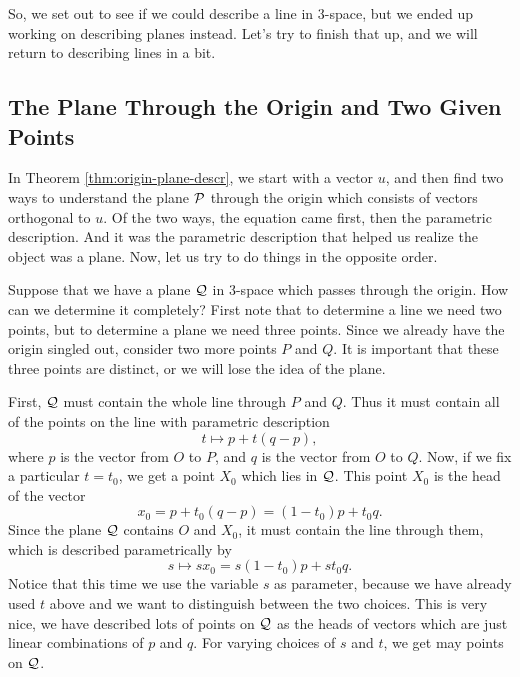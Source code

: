 \documentclass[00-livre-main.tex]{subfiles}
\begin{document}
So, we set out to see if we could describe a line in $3$-space, but we ended up working on describing planes instead. Let's try to finish that up, and we will return to describing lines in a bit.

\subsection*{The Plane Through the Origin and Two Given Points}


In Theorem \ref{thm:origin-plane-descr}, we start with a vector $u$, and then find two ways to understand the plane $\mathcal{P}$ through the origin which consists of vectors orthogonal to $u$. Of the two ways, the equation came first, then the parametric description. And it was the parametric description that helped us realize the object was a plane. 
Now, let us try to do things in the opposite order. 

Suppose that we have a plane $\mathcal{Q}$ in $3$-space which passes through the origin. How can we determine it completely? First note that to determine a line we need two points, but to determine a plane we need three points. Since we already have the origin singled out, consider two more points $P$ and $Q$. It is important that these three points are distinct, or we will lose the idea of the plane. 

First, $\mathcal{Q}$ must contain the whole line through $P$ and $Q$. Thus it must contain all of the points on the line with parametric description
\[
t \mapsto p + t(q-p),
\]
where $p$ is the vector from $O$ to $P$, and $q$ is the vector from $O$ to $Q$. Now, if we fix a particular $t=t_0$, we get a point $X_0$ which lies in $\mathcal{Q}$. This point $X_0$ is the head of the vector 
\[
x_0 = p + t_0 (q-p) = (1-t_0) p + t_0 q.
\]
Since the plane $\mathcal{Q}$ contains $O$ and $X_0$, it must contain the line through them, which is described parametrically by
\[
s \mapsto s x_0 = s(1-t_0) p + st_0 q.
\]
Notice that this time we use the variable $s$ as parameter, because we have already used $t$ above and we want to distinguish between the two choices. This is very nice, we have described lots of points on $\mathcal{Q}$ as the heads of vectors which are just linear combinations of $p$ and $q$. For varying choices of $s$ and $t$, we get may points on $\mathcal{Q}$.
\end{document}
